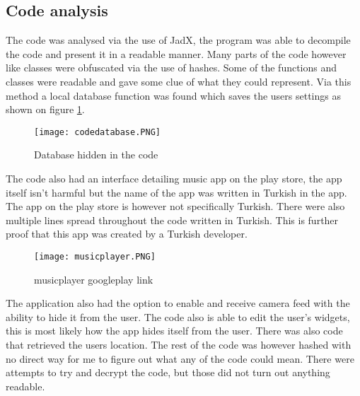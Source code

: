 \subsection{Code analysis}

The code was analysed via the use of JadX, the program was able to decompile the code and present it in a readable manner. 
Many parts of the code however like classes were obfuscated via the use of hashes. 
Some of the functions and classes were readable and gave some clue of what they could represent. 
Via this method a local database function was found which saves the users settings as shown on figure \ref{tim-database}.

\begin{figure}[H]
    \texttt{[image: codedatabase.PNG]}
    \caption{Database hidden in the code}
    \label{tim-database}
\end{figure}

The code also had an interface detailing music app on the play store, the app itself isn’t harmful but the name of the app was written in Turkish in the app. 
The app on the play store is however not specifically Turkish. 
There were also multiple lines spread throughout the code written in Turkish. 
This is further proof that this app was created by a Turkish developer.

\begin{figure}[H]
    \texttt{[image: musicplayer.PNG]}
    \caption{musicplayer googleplay link}
    \label{tim-music}
\end{figure}

The application also had the option to enable and receive camera feed with the ability to hide it from the user. 
The code also is able to edit the user’s widgets, this is most likely how the app hides itself from the user. 
There was also code that retrieved the users location. 
The rest of the code was however hashed with no direct way for me to figure out what any of the code could mean. 
There were attempts to try and decrypt the code, but those did not turn out anything readable.
